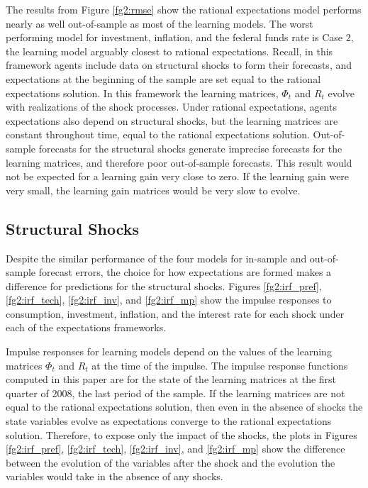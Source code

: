 {The results from Figure \ref{fg2:rmse} show the rational expectations model performs nearly as well out-of-sample as most of the learning models.  The worst performing model for investment, inflation, and the federal funds rate is Case 2, the learning model arguably closest to rational expectations.  Recall, in this framework agents include data on structural shocks to form their forecasts, and expectations at the beginning of the sample are set equal to the rational expectations solution.  In this framework the learning matrices, $\Phi_t$ and $R_t$ evolve with realizations of the shock processes.  Under rational expectations, agents expectations also depend on structural shocks, but the learning matrices are constant throughout time, equal to the rational expectations solution.  Out-of-sample forecasts for the structural shocks generate imprecise forecasts for the learning matrices, and therefore poor out-of-sample forecasts.  This result would not be expected for a learning gain very close to zero.  If the learning gain were very small, the learning gain matrices would be very slow to evolve.  

\subsection{Structural Shocks}
Despite the similar performance of the four models for in-sample and out-of-sample forecast errors, the choice for how expectations are formed makes a difference for predictions for the structural shocks.  Figures \ref{fg2:irf_pref}, \ref{fg2:irf_tech}, \ref{fg2:irf_inv}, and \ref{fg2:irf_mp} show the impulse responses to consumption, investment, inflation, and the interest rate for each shock under each of the expectations frameworks. 

Impulse responses for learning models depend on the values of the learning matrices $\Phi_t$ and $R_t$ at the time of the impulse.  The impulse response functions computed in this paper are for the state of the learning matrices at the first quarter of 2008, the last period of the sample.  If the learning matrices are not equal to the rational expectations solution, then even in the absence of shocks the state variables evolve as expectations converge to the rational expectations solution.  Therefore, to expose only the impact of the shocks, the plots in Figures \ref{fg2:irf_pref}, \ref{fg2:irf_tech}, \ref{fg2:irf_inv}, and \ref{fg2:irf_mp} show the difference between the evolution of the variables after the shock and the evolution the variables would take in the absence of any shocks.

}
